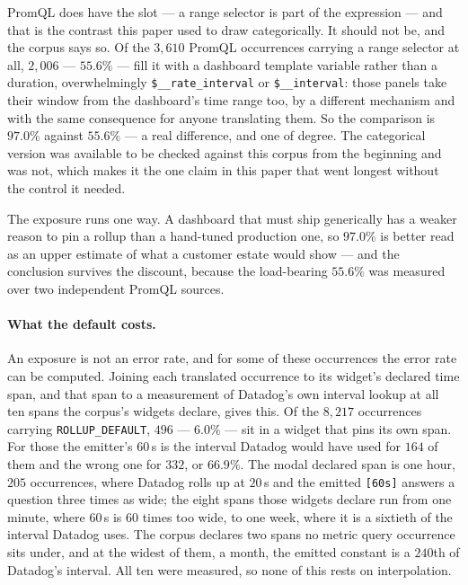 PromQL does have the slot --- a range selector is part of the expression --- and that is
the contrast this paper used to draw categorically. It should not be, and the corpus says
so. Of the $3{,}610$ PromQL occurrences carrying a range selector at all, $2{,}006$ ---
$55.6\%$ --- fill it with a dashboard template variable rather than a duration,
overwhelmingly \texttt{\$\_\_rate\_interval} or \texttt{\$\_\_interval}: those panels take
their window from the dashboard's time range too, by a different mechanism and with the
same consequence for anyone translating them. So the comparison is $97.0\%$ against
$55.6\%$ --- a real difference, and one of degree. The categorical version was available to
be checked against this corpus from the beginning and was not, which makes it the one claim
in this paper that went longest without the control it needed.

The exposure runs one way. A dashboard that must ship generically has a weaker reason to
pin a rollup than a hand-tuned production one, so $97.0\%$ is better read as an upper
estimate of what a customer estate would show --- and the conclusion survives the
discount, because the load-bearing $55.6\%$ was measured over two independent PromQL
sources.

\paragraph{What the default costs.}
An exposure is not an error rate, and for some of these occurrences the error rate can be
computed. Joining each translated occurrence to its widget's declared time span, and that
span to a measurement of Datadog's own interval lookup at all ten spans the corpus's
widgets declare, gives this. Of the $8{,}217$ occurrences carrying
\texttt{ROLLUP\_DEFAULT}, $496$ --- $6.0\%$ --- sit in a widget that pins its own span. For
those the emitter's $60$\,s is the interval Datadog would have used for $164$ of them and
the wrong one for $332$, or $66.9\%$. The modal declared span is one hour, $205$
occurrences, where Datadog rolls up at $20$\,s and the emitted \texttt{[60s]} answers a
question three times as wide; the eight spans those widgets declare run from one minute,
where $60$\,s is $60$ times too wide, to one week, where it is a sixtieth of the interval
Datadog uses. The corpus declares two spans no metric query occurrence sits under, and at
the widest of them, a month, the emitted constant is a $240$th of Datadog's interval. All
ten were measured, so none of this rests on interpolation.

